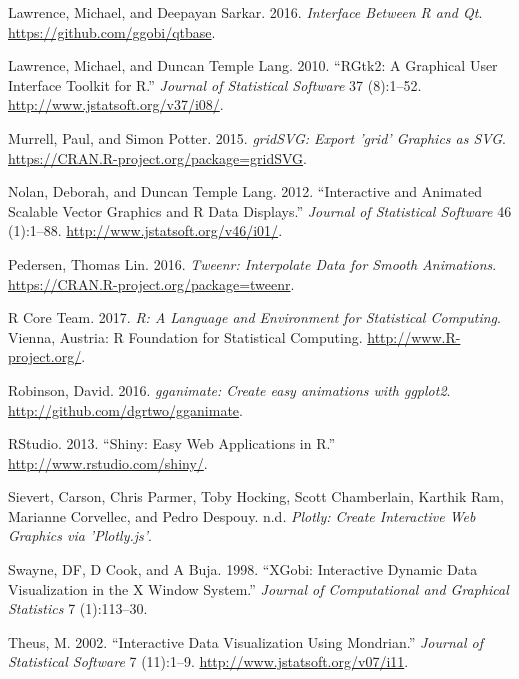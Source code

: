\documentclass[12pt,]{article}
\theoremstyle{definition}
\theoremstyle{definition}
\theoremstyle{definition}
\theoremstyle{remark}
\begin{document}
\leavevmode\hypertarget{ref-qtbase}{}%
Lawrence, Michael, and Deepayan Sarkar. 2016. \emph{Interface Between R
and Qt}. \url{https://github.com/ggobi/qtbase}.

\leavevmode\hypertarget{ref-RGtk2}{}%
Lawrence, Michael, and Duncan Temple Lang. 2010. ``RGtk2: A Graphical
User Interface Toolkit for R.'' \emph{Journal of Statistical Software}
37 (8):1--52. \url{http://www.jstatsoft.org/v37/i08/}.

\leavevmode\hypertarget{ref-gridSVG}{}%
Murrell, Paul, and Simon Potter. 2015. \emph{gridSVG: Export 'grid'
Graphics as SVG}. \url{https://CRAN.R-project.org/package=gridSVG}.

\leavevmode\hypertarget{ref-SVGAnnotation}{}%
Nolan, Deborah, and Duncan Temple Lang. 2012. ``Interactive and Animated
Scalable Vector Graphics and R Data Displays.'' \emph{Journal of
Statistical Software} 46 (1):1--88.
\url{http://www.jstatsoft.org/v46/i01/}.

\leavevmode\hypertarget{ref-tweenr}{}%
Pedersen, Thomas Lin. 2016. \emph{Tweenr: Interpolate Data for Smooth
Animations}. \url{https://CRAN.R-project.org/package=tweenr}.

\leavevmode\hypertarget{ref-RCore}{}%
R Core Team. 2017. \emph{R: A Language and Environment for Statistical
Computing}. Vienna, Austria: R Foundation for Statistical Computing.
\url{http://www.R-project.org/}.

\leavevmode\hypertarget{ref-gganimate}{}%
Robinson, David. 2016. \emph{gganimate: Create easy animations with
ggplot2}. \url{http://github.com/dgrtwo/gganimate}.

\leavevmode\hypertarget{ref-shiny}{}%
RStudio. 2013. ``Shiny: Easy Web Applications in R.''
\url{http://www.rstudio.com/shiny/}.

\leavevmode\hypertarget{ref-plotly}{}%
Sievert, Carson, Chris Parmer, Toby Hocking, Scott Chamberlain, Karthik
Ram, Marianne Corvellec, and Pedro Despouy. n.d. \emph{Plotly: Create
Interactive Web Graphics via 'Plotly.js'}.

\leavevmode\hypertarget{ref-xgobi}{}%
Swayne, DF, D Cook, and A Buja. 1998. ``XGobi: Interactive Dynamic Data
Visualization in the X Window System.'' \emph{Journal of Computational
and Graphical Statistics} 7 (1):113--30.

\leavevmode\hypertarget{ref-mondrian}{}%
Theus, M. 2002. ``Interactive Data Visualization Using Mondrian.''
\emph{Journal of Statistical Software} 7 (11):1--9.
\url{http://www.jstatsoft.org/v07/i11}.
\end{document}
